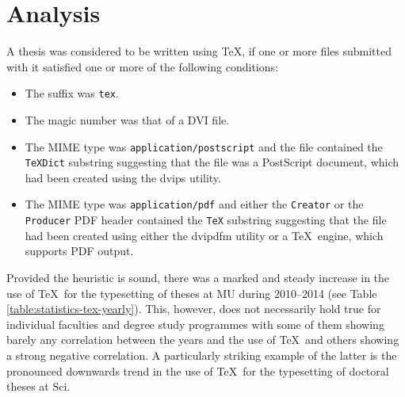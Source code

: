 \documentclass{csbulletin}
\begin{document}
{  \section{Analysis}
  A thesis was considered to be written using \TeX, if one
  or more files submitted with it satisfied one or more of the
  following conditions: \begin{itemize}
    \item The suffix was \texttt{tex}.
    \item The magic number was that of a DVI file.
    \item The MIME type was \texttt{application/postscript} and
      the file contained the \texttt{TeXDict} substring suggesting
      that the file was a PostScript document, which had been created
      using the \textsf{dvips} utility.
    \item The MIME type was \texttt{application/pdf} and either
      the \texttt{Creator} or the \texttt{Producer} PDF
      header contained the \texttt{TeX} substring suggesting that
      the file had been created using either the \textsf{dvipdfm}
      utility or a \TeX\ engine, which supports PDF output.
  \end{itemize} Provided the heuristic is sound, there was a marked
  and steady increase in the use of \TeX\ for the typesetting
  of theses at MU during 2010--2014 (see Table
  \ref{table:statistics-tex-yearly}). This, however, does not
  necessarily hold true for individual faculties and degree study
  programmes with some of them showing barely any correlation
  between the years and the use of \TeX\ and others showing a
  strong negative correlation. A particularly striking example of
  the latter is the pronounced downwards trend in the use of
  \TeX\ for the typesetting of doctoral theses at Sci.

}
\end{document}
